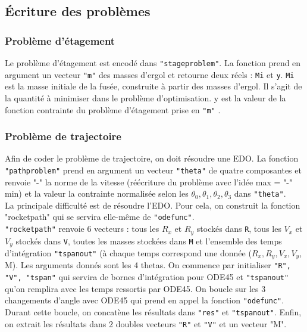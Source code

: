 \subsection{\'Ecriture des problèmes}\medbreak
\subsubsection{Problème d'étagement}\medbreak
Le problème d'étagement est encodé dans \texttt{"stageproblem"}. La fonction prend en argument un vecteur \texttt{"m"} des masses d'ergol et retourne deux réels : \texttt{Mi} et \texttt{y}. \texttt{Mi} est la masse initiale de la fusée, construite à partir des masses d'ergol. Il s'agit de la quantité à minimiser dans le problème d'optimisation. y est la valeur de la fonction contrainte du problème d'étagement prise en \texttt{"m"} .\medbreak
\subsubsection{Problème de trajectoire}\medbreak

Afin de coder le problème de trajectoire, on doit résoudre une EDO. La fonction \texttt{"pathproblem"} prend en argument un vecteur \texttt{"theta"} de quatre composantes et renvoie "-" la norme de la vitesse (réécriture du problème avec l'idée max = "-" min) et la valeur la contrainte normalisée selon les $\theta_0, \theta_1, \theta_2, \theta_3$ dans \texttt{"theta"}. \\
La principale difficulté est de résoudre l'EDO. Pour cela, on construit la fonction "rocketpath" qui se servira elle-même de \texttt{"odefunc"}.\\
\texttt{"rocketpath"} renvoie 6 vecteurs : tous les $R_x$ et $R_y$ stockés dans \texttt{R}, tous les $V_x$ et $V_y$ stockés dans \texttt{V}, toutes les masses stockées dans \texttt{M} et l'ensemble des temps d'intégration \texttt{"tspanout"} (à chaque temps correspond une donnée ($R_x,R_y,V_x,V_y$, M). Les arguments donnés sont les 4 thetas. On commence par initialiser \texttt{"R", "V", "tspan"} qui servira de bornes d'intégration pour ODE45 et \texttt{"tspanout"} qu'on remplira avec les temps ressortis par ODE45. On boucle sur les 3 changements d'angle avec ODE45 qui prend en appel la fonction \texttt{"odefunc"}. Durant cette boucle, on concatène les résultats dans \texttt{"res"} et \texttt{"tspanout"}. Enfin, on extrait les résultats dans 2 doubles vecteurs \texttt{"R"} et \texttt{"V"} et un vecteur "M".\\

